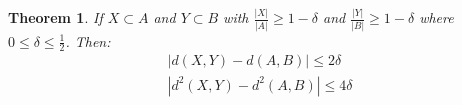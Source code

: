 \documentclass{tufte-handout}
\newtheorem{theorem}{Theorem}[]
\begin{document}
\begin{theorem}
	If $X\subset A$ and $Y\subset B$ with $\frac{|X|}{|A|}\geq 1-\delta$ and $\frac{|Y|}{|B|}\geq 1-\delta$ where $0\leq \delta\leq\frac{1}{2}$. Then:
	\begin{align}
	|d(X,Y)-d(A,B)|\leq 2\delta\\
	|d^2(X,Y)-d^2(A,B)|\leq 4\delta
	\end{align}
\end{theorem}\noindent
\begin{marginfigure}



	\begin{tikzpicture}[x=0.75pt,y=0.75pt,yscale=-1,xscale=1]


\end{tikzpicture}
\end{marginfigure}
\end{document}
